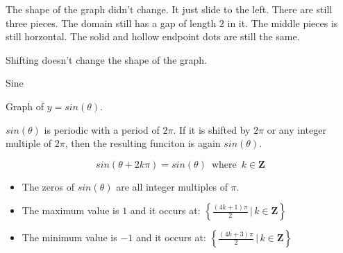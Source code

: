 \documentclass{ximera}
\begin{document}
The shape of the graph didn't change. It just slide to the left. There are still three pieces. The domain still has a gap of length $2$ in it.  The middle pieces is still horzontal.  The solid and hollow endpoint dots are still the same.

Shifting doesn't change the shape of the graph.










\begin{example} Sine



Graph of $y = sin(\theta)$.

\begin{image}
\end{image}



$sin(\theta)$ is periodic with a period of $2\pi$.  If it is shifted by $2\pi$ or any integer multiple of $2\pi$, then the resulting funciton is again $sin(\theta)$.


\[    sin(\theta + 2k\pi) = sin(\theta)   \,   \text{ where }  \,  k \in \textbf{Z}       \]



\begin{itemize}
\item The zeros of $sin(\theta)$ are all integer multiples of $\pi$.
\item The maximum value is $1$ and it occurs at:  $\left\{     \frac{(4k+1)\pi}{2} \, | \, k \in \textbf{Z}     \right\}$
\item The minimum value is $-1$ and it occurs at:  $\left\{    \frac{(4k+3)\pi}{2} \, | \, k \in \textbf{Z}     \right\}$
\end{itemize}



\end{example}
\end{document}
